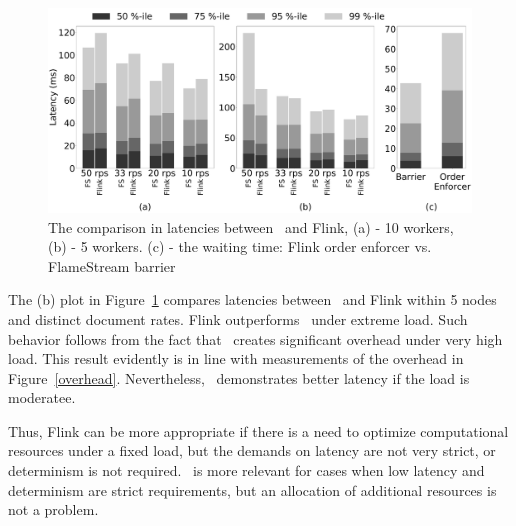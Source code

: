 \begin{figure}[ht]
  \centering
  \includegraphics[width=\textwidth]{pics/comp-index-quantiles}
  \caption{The comparison in latencies between \FlameStream\ and Flink, (a) - 10 workers, (b) - 5 workers. (c) - the waiting time: Flink order enforcer vs. FlameStream barrier}
  \label {fs-index-quantiles}
\end{figure}


The (b) plot in Figure~\ref{fs-index-quantiles} 
compares  latencies between \FlameStream\ and Flink within 5 nodes and distinct document rates. 
Flink outperforms \FlameStream\ under extreme load. 
Such behavior follows from the fact that \FlameStream\ creates significant overhead under very high load.
This result evidently is in line with measurements of the overhead in Figure~\ref{overhead}. 
Nevertheless,  \FlameStream\ demonstrates better latency if the load is moderatee.

Thus, Flink can be more appropriate if there is a need to optimize computational resources under a fixed load, but the demands on latency are not very strict, or determinism is not required. \FlameStream\ is more relevant for cases when low latency and determinism are strict requirements, but an allocation of additional resources is not a problem.  


